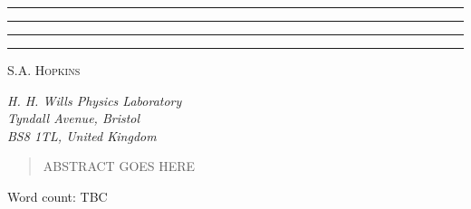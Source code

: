 \begin{titlepage}
    \begin{center}
            
        \vspace*{\baselineskip}

        \rule{\textwidth}{1.6pt}\vspace*{-\baselineskip}\vspace*{2pt} %
	    \rule{\textwidth}{0.4pt} %

        \vspace{1.5\baselineskip}


        \vspace{0.75\baselineskip} %
	
        \rule{\textwidth}{0.4pt}\vspace*{-\baselineskip}\vspace{3.2pt} %
        \rule{\textwidth}{1.6pt} %
        
        \vspace{1.5\baselineskip}

        \textsc{\Large S.A. Hopkins}

        \vspace{0.5cm}
        \textit{H. H. Wills Physics Laboratory \\ Tyndall Avenue, Bristol \\ BS8 1TL, United Kingdom}

        \vspace{0.5cm}
        \begin{abstract}
            \textsc{ABSTRACT GOES HERE}
        \end{abstract}
        \vspace{9mm}
   
   

    \end{center}
    \begin{flushright}
    {\small Word count: TBC}
    \end{flushright}
    
\end{titlepage}